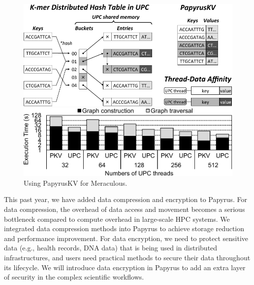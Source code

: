 \begin{figure}[t]
    \centering
    \begin{subfloat}
        \centering
        \includegraphics[width=.48\textwidth]{projects/2.3.2-Tools/2.3.2.10-PROTEAS-YTUNE/papyrus-meraculous}
    \end{subfloat}
    \hfill
    \begin{subfloat}
        \centering
        \includegraphics[width=.48\textwidth]{projects/2.3.2-Tools/2.3.2.10-PROTEAS-YTUNE/papyrus-meraculous-eval}
    \end{subfloat}
    \caption{Using PapyrusKV for Meraculous.}
\end{figure}



This past year, we have added data compression and encryption to Papyrus. For data compression, the overhead of data access and movement becomes a serious bottleneck compared to compute overhead in large-scale HPC systems. We integrated data compression methods into Papyrus to achieve storage reduction and performance improvement. 
For data encryption, we need to protect sensitive data (e.g., health records, DNA data) that is being used in distributed infrastructures, and users need practical methods to secure their data throughout its lifecycle. We will introduce data encryption in Papyrus to add an extra layer of security in the complex scientific workflows.



